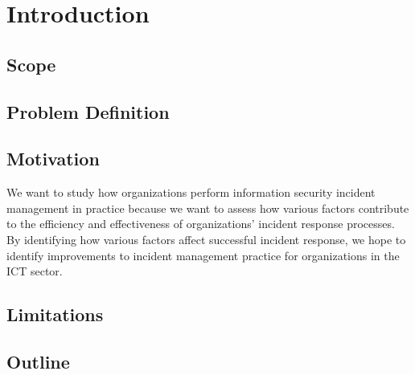 \chapter{Introduction}
\section{Scope}

\section{Problem Definition}

\section{Motivation}
We want to study how organizations perform information security incident management in practice because we want to assess how various factors contribute to the efficiency and effectiveness of organizations’ incident response processes. By identifying how various factors affect successful incident response, we hope to identify improvements to incident management practice for organizations in the ICT sector. 

\section{Limitations}

\section{Outline}